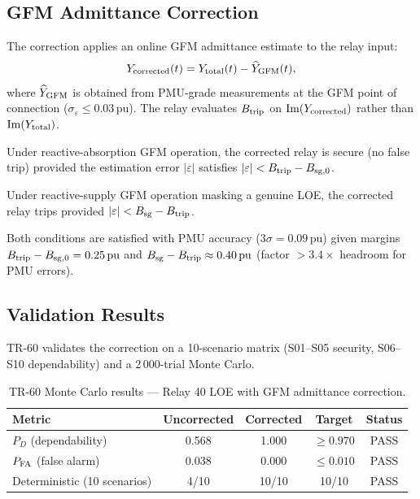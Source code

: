 \subsection{GFM Admittance Correction}
\label{sec:ch6_loe_correction}

The correction applies an online GFM admittance estimate to the relay input:
\begin{equation}
  Y_{\rm corrected}(t) = Y_{\rm total}(t) - \widehat{Y}_{\rm GFM}(t),
  \label{eq:ch6_ycorr}
\end{equation}
where $\widehat{Y}_{\rm GFM}$ is obtained from PMU-grade measurements at the
GFM point of connection ($\sigma_\varepsilon \leq 0.03\,\text{pu}$).
The relay evaluates $B_{\rm trip}$ on $\Im(Y_{\rm corrected})$ rather than
$\Im(Y_{\rm total})$.

\begin{proposition}
  \label{prop:ch6_fm1}
  Under reactive-absorption GFM operation, the corrected relay is secure
  (no false trip) provided the estimation error $|\varepsilon|$ satisfies
  $|\varepsilon| < B_{\rm trip} - B_{\rm sg,0}$.
\end{proposition}

\begin{proposition}
  \label{prop:ch6_fm2}
  Under reactive-supply GFM operation masking a genuine LOE, the corrected
  relay trips provided $|\varepsilon| < B_{\rm sg} - B_{\rm trip}$.
\end{proposition}

Both conditions are satisfied with PMU accuracy
($3\sigma = 0.09\,\text{pu}$) given margins
$B_{\rm trip} - B_{\rm sg,0} = 0.25\,\text{pu}$ and
$B_{\rm sg} - B_{\rm trip} \approx 0.40\,\text{pu}$ (factor $> 3.4\times$
headroom for PMU errors).

\subsection{Validation Results}
\label{sec:ch6_loe_results}

TR-60 validates the correction on a 10-scenario matrix (S01--S05 security,
S06--S10 dependability) and a 2\,000-trial Monte Carlo.

\begin{table}[h]
  \centering
  \caption{TR-60 Monte Carlo results — Relay 40 LOE with GFM admittance correction.}
  \label{tab:ch6_loe_mc}
  \begin{tabular}{lcccc}
    \toprule
    Metric & Uncorrected & Corrected & Target & Status \\
    \midrule
    $P_D$ (dependability) & 0.568 & 1.000 & $\geq 0.970$ & PASS \\
    $P_{\rm FA}$ (false alarm) & 0.038 & 0.000 & $\leq 0.010$ & PASS \\
    Deterministic (10 scenarios) & 4/10 & 10/10 & 10/10 & PASS \\
    \bottomrule
  \end{tabular}
\end{table}

